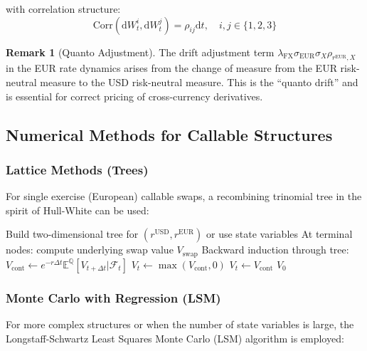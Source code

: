 \documentclass[conference]{IEEEtran}
\theoremstyle{definition}
\newtheorem{remark}{Remark}[section]
\newcommand{\E}{\mathbb{E}}
\newcommand{\Q}{\mathbb{Q}}
\newcommand{\diff}{\mathrm{d}}
\begin{document}
with correlation structure:
\begin{equation}
\text{Corr}(\diff W^i_t, \diff W^j_t) = \rho_{ij} \diff t, \quad i,j \in \{1,2,3\}
\end{equation}

\begin{remark}[Quanto Adjustment]
The drift adjustment term $\lambda_{\text{FX}} \sigma_{\text{EUR}} \sigma_X \rho_{r^{\text{EUR}},X}$ in the EUR rate dynamics arises from the change of measure from the EUR risk-neutral measure to the USD risk-neutral measure. This is the ``quanto drift'' and is essential for correct pricing of cross-currency derivatives.
\end{remark}

\subsection{Numerical Methods for Callable Structures}

\subsubsection{Lattice Methods (Trees)}

For single exercise (European) callable swaps, a recombining trinomial tree in the spirit of Hull-White can be used:

\begin{algorithm}
\caption{Trinomial Tree for Callable CCIRS}
\begin{algorithmic}[1]
\State Build two-dimensional tree for $(r^{\text{USD}}, r^{\text{EUR}})$ or use state variables
\State At terminal nodes: compute underlying swap value $V_{\text{swap}}$
\State Backward induction through tree:
        \State $V_{\text{cont}} \gets e^{-r \Delta t} \E^{\Q}[V_{t+\Delta t} | \mathcal{F}_t]$
            \State $V_t \gets \max(V_{\text{cont}}, 0)$ 
        \Else
            \State $V_t \gets V_{\text{cont}}$
        \EndIf
    \EndFor
\EndFor
\State \Return $V_0$
\end{algorithmic}
\end{algorithm}

\subsubsection{Monte Carlo with Regression (LSM)}

For more complex structures or when the number of state variables is large, the Longstaff-Schwartz Least Squares Monte Carlo (LSM) algorithm is employed:
\end{document}
